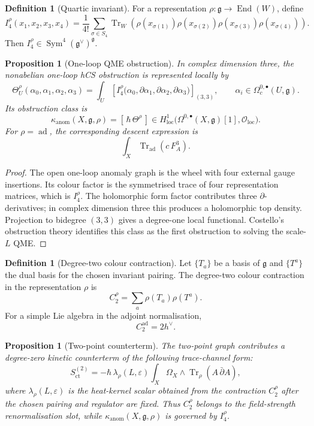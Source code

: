 \documentclass[11pt]{amsart}
\theoremstyle{plain}
\newtheorem{proposition}[theorem]{Proposition}
\theoremstyle{definition}
\newtheorem{definition}[theorem]{Definition}
\theoremstyle{remark}
\providecommand{\cO}{\mathcal{O}}
\providecommand{\fg}{\mathfrak{g}}
\providecommand{\End}{\operatorname{End}}
\providecommand{\Tr}{\operatorname{Tr}}
\providecommand{\Sym}{\operatorname{Sym}}
\providecommand{\dbar}{\bar\partial}
\providecommand{\kanom}{\kappa_{\mathrm{anom}}}
\begin{document}
\begin{definition}[Quartic invariant]
\label{def:quartic-invariant}
For a representation \(\rho:\fg\to\End(W)\), define
\[
  I_4^\rho(x_1,x_2,x_3,x_4)
  =
  \frac1{4!}\sum_{\sigma\in S_4}
  \Tr_W\!\left(
    \rho(x_{\sigma(1)})\rho(x_{\sigma(2)})
    \rho(x_{\sigma(3)})\rho(x_{\sigma(4)})
  \right).
\]
Then \(I_4^\rho\in\Sym^4(\fg^\vee)^\fg\).
\end{definition}

\begin{proposition}[One-loop QME obstruction]
\label{prop:qme-obstruction}
In complex dimension three, the nonabelian one-loop hCS obstruction is
represented locally by
\[
  \Theta^\rho_U(\alpha_0,\alpha_1,\alpha_2,\alpha_3)
  =
  \int_U
  \left[
  I_4^\rho\bigl(
    \alpha_0,\partial\alpha_1,\partial\alpha_2,\partial\alpha_3
  \bigr)
  \right]_{(3,3)},
  \qquad
  \alpha_i\in\Omega^{0,\bullet}_c(U,\fg).
\]
Its obstruction class is
\[
  \kanom(X,\fg,\rho)
  =
  [\,\hbar\,\Theta^\rho\,]
  \in
  H^1_{\mathrm{loc}}
  \bigl(\Omega^{0,\bullet}(X,\fg)[1],\cO_{\mathrm{loc}}\bigr).
\]
For \(\rho=\operatorname{ad}\), the corresponding descent expression is
\[
  \int_X \Tr_{\operatorname{ad}}(c\,F_A^3).
\]
\end{proposition}

\begin{proof}
The open one-loop anomaly graph is the wheel with four external gauge
insertions. Its colour factor is the symmetrised trace of four
representation matrices, which is \(I_4^\rho\). The holomorphic form
factor contributes three \(\partial\)-derivatives; in complex dimension
three this produces a holomorphic top density. Projection to bidegree
\((3,3)\) gives a degree-one local functional. Costello's obstruction
theory identifies this class as the first obstruction to solving the
scale-\(L\) QME.
\end{proof}

\begin{definition}[Degree-two colour contraction]
\label{def:degree-two-colour}
Let \(\{T_a\}\) be a basis of \(\fg\) and \(\{T^a\}\) the dual basis
for the chosen invariant pairing. The degree-two colour contraction in
the representation \(\rho\) is
\[
  C_2^\rho=\sum_a \rho(T_a)\rho(T^a).
\]
For a simple Lie algebra in the adjoint normalisation,
\[
  C_2^{\operatorname{ad}}=2h^\vee .
\]
\end{definition}

\begin{proposition}[Two-point counterterm]
\label{prop:c2-counterterm}
The two-point graph contributes a degree-zero kinetic counterterm of
the following trace-channel form:
\[
  S_{\mathrm{ct}}^{(2)}
  =
  -\hbar\,\lambda_\rho(L,\varepsilon)
  \int_X\Omega_X\wedge\Tr_\rho(A\,\dbar A),
\]
where \(\lambda_\rho(L,\varepsilon)\) is the heat-kernel scalar obtained
from the contraction \(C_2^\rho\) after the chosen pairing and regulator
are fixed. Thus \(C_2^\rho\) belongs to the field-strength
renormalisation slot, while
\(\kanom(X,\fg,\rho)\) is governed by \(I_4^\rho\).
\end{proposition}
\end{document}
